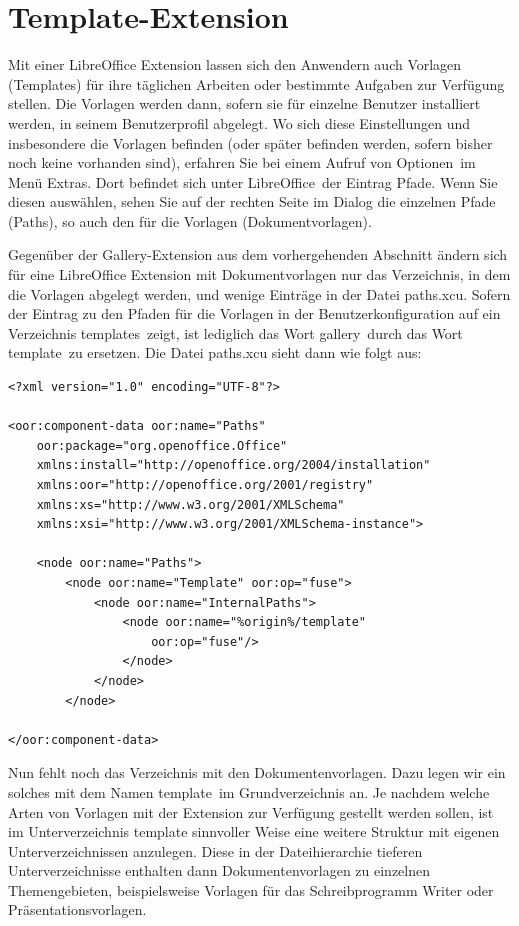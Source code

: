 \documentclass[a4paper,10pt,pagesize,titlepage]{scrbook}
\begin{document}
\section{Template-Extension}

Mit einer LibreOffice Extension lassen sich den Anwendern auch Vorlagen (Templates) für ihre täglichen Arbeiten oder bestimmte Aufgaben zur Verfügung stellen. Die Vorlagen werden dann, sofern sie für einzelne Benutzer installiert werden, in seinem Benutzerprofil abgelegt. Wo sich diese Einstellungen und insbesondere die Vorlagen befinden (oder später befinden werden, sofern bisher noch keine vorhanden sind), erfahren Sie bei einem Aufruf von \glqq Optionen\grqq~im Menü \glqq Extras\grqq. Dort befindet sich unter \glqq LibreOffice\grqq~der Eintrag \glqq Pfade\grqq. Wenn Sie diesen auswählen, sehen Sie auf der rechten Seite im Dialog die einzelnen Pfade (Paths), so auch den für die Vorlagen (\glqq Dokumentvorlagen\grqq).

Gegenüber der Gallery-Extension aus dem vorhergehenden Abschnitt ändern sich für  eine LibreOffice Extension mit Dokumentvorlagen nur das Verzeichnis, in dem die Vorlagen abgelegt werden, und wenige Einträge in der Datei \glqq paths.xcu\grqq. Sofern der Eintrag zu den Pfaden für die Vorlagen in der Benutzerkonfiguration auf ein Verzeichnis \glqq templates\grqq~zeigt, ist lediglich das Wort \glqq gallery\grqq~durch das Wort \glqq template\grqq~zu ersetzen. Die Datei paths.xcu sieht dann wie folgt aus:

\begin{lstlisting}
<?xml version="1.0" encoding="UTF-8"?>

<oor:component-data oor:name="Paths" 
    oor:package="org.openoffice.Office" 
    xmlns:install="http://openoffice.org/2004/installation" 
    xmlns:oor="http://openoffice.org/2001/registry"
    xmlns:xs="http://www.w3.org/2001/XMLSchema" 
    xmlns:xsi="http://www.w3.org/2001/XMLSchema-instance">

    <node oor:name="Paths">
        <node oor:name="Template" oor:op="fuse">
            <node oor:name="InternalPaths">
                <node oor:name="%origin%/template" 
                    oor:op="fuse"/>
                </node>
            </node>
        </node>

</oor:component-data>
\end{lstlisting}
Nun fehlt noch das Verzeichnis mit den Dokumentenvorlagen. Dazu legen wir ein solches mit dem Namen \glqq template\grqq~im Grundverzeichnis an. Je nachdem welche Arten von Vorlagen mit der Extension zur Verfügung gestellt werden sollen, ist im Unterverzeichnis template sinnvoller Weise eine weitere Struktur mit eigenen Unterverzeichnissen anzulegen. Diese in der Dateihierarchie tieferen Unterverzeichnisse enthalten dann Dokumentenvorlagen zu einzelnen Themengebieten, beispielsweise Vorlagen für das Schreibprogramm Writer oder Präsentationsvorlagen.
\end{document}
